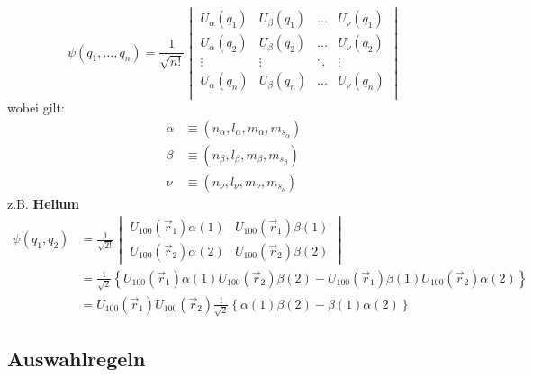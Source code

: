 \begin{equation*}
\psi(q_1, \dots, q_n) = \frac{1}{\sqrt{n !}} \begin{vmatrix}
U_{\alpha} (q_1) & U_{\beta} (q_1) & \dots  & U_{\nu} (q_1) \\
U_{\alpha} (q_2) & U_{\beta} (q_2) & \dots  & U_{\nu} (q_2) \\
\vdots           & \vdots          & \ddots & \vdots \\
U_{\alpha} (q_n) & U_{\beta} (q_n) & \dots  & U_{\nu} (q_n) \\
\end{vmatrix}
\end{equation*}
wobei gilt:
\begin{align*}
\alpha &\equiv (n_\alpha, l_\alpha, m_\alpha, m_{s_\alpha}) \\
\beta &\equiv (n_\beta, l_\beta, m_\beta, m_{s_\beta}) \\
\nu &\equiv (n_\nu, l_\nu, m_\nu, m_{s_\nu})
\end{align*}
z.B. \textbf{Helium}
\begin{align*}
\psi(q_1,q_2) &= \frac{1}{\sqrt{2!}} \begin{vmatrix}
U_{100}(\vec{r}_1) \alpha(1) & U_{100}(\vec{r}_1) \beta(1) \\
U_{100}(\vec{r}_2) \alpha(2) & U_{100}(\vec{r}_2) \beta(2)
\end{vmatrix} \\
&= \frac{1}{\sqrt{2}} \left\{ U_{100}(\vec{r}_1) \alpha(1) U_{100}(\vec{r}_2) \beta(2) - U_{100}(\vec{r}_1) \beta(1) U_{100}(\vec{r}_2) \alpha(2) \right\} \\
&= U_{100}(\vec{r}_1) U_{100}(\vec{r}_2) \frac{1}{\sqrt{2}} \left\{ \alpha(1) \beta(2) - \beta(1) \alpha(2) \right\}
\end{align*}

\subsection{Auswahlregeln}

